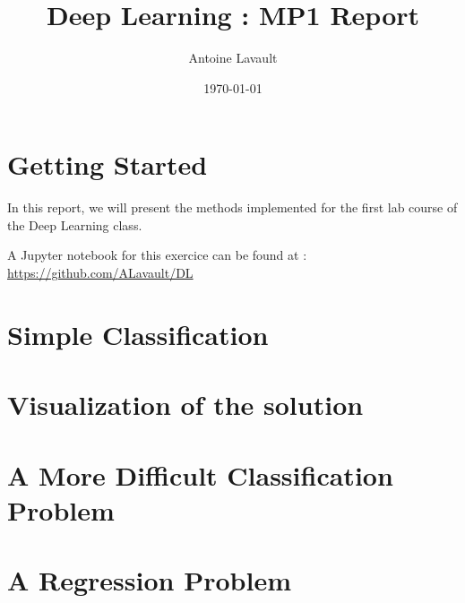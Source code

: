 \documentclass[]{article}
\title{Deep Learning : MP1 Report}
\author{Antoine Lavault}
\date{\today}
\begin{document}
\maketitle

\section*{Getting Started}

In this report, we will present the methods implemented for the first lab course of the Deep Learning class.

A Jupyter notebook for this exercice can be found at : \href{https://github.com/ALavault/DL}{https://github.com/ALavault/DL}


\section{Simple Classification}

\section{Visualization of the solution}

\section{A More Difficult Classification Problem}

\section{A Regression Problem}
\end{document}
